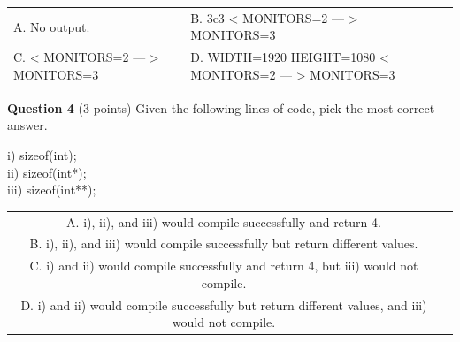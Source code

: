 \documentclass{exam}
\begin{document}
\begin{center}

\begin{tabular} { p{3in}  p{3in} } 
  A.  No output. & B. \newline 3c3 \newline < MONITORS=2 \newline --- \newline > MONITORS=3 \newline \\

  C.  \newline < MONITORS=2 \newline --- \newline > MONITORS=3 & D. \newline WIDTH=1920 \newline HEIGHT=1080 \newline < MONITORS=2 \newline --- \newline > MONITORS=3 \\
\end{tabular}

\end{center}

\vspace{10px}

\textbf{Question 4} (3 points) Given the following lines of code, pick the most correct answer.

\begin{center}
i) sizeof(int);\\
ii) sizeof(int*);\\
iii) sizeof(int**);\\
\end{center}

\begin{center}

\begin{tabular} { c  c } 
  A. i), ii), and iii) would compile successfully and return 4. \\
  B. i), ii), and iii) would compile successfully but return different values. \\ 
  C. i) and ii) would compile successfully and return 4, but iii) would not compile. \\ 
  D. i) and ii) would compile successfully but return different values, and iii) would not compile.
\end{tabular}

\end{center}
\end{document}
